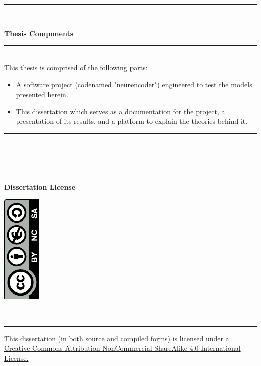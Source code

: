 \documentclass[a4paper, 12pt]{report}
\newenvironment{nscenter}
{\parskip=0.2cm\par\nopagebreak\raggedright}
{\parskip=0pt\par\noindent\ignorespacesafterend}
\begin{document}
\begin{titlepage}	
	\rule{\linewidth}{0.5mm} \\[0.1cm]
	\vspace{-0.1cm}
	\begin{minipage}{\textwidth}
		\Large{\textbf{Thesis Components}}
	\end{minipage}
	\rule{\linewidth}{0.2mm} \\[0.1cm]
	\noindent
		This thesis is comprised of the following parts:
		\begin{itemize}[nosep]
			\item A software project (codenamed "neurencoder") engineered to test the models presented herein.
			\item This dissertation which serves as a documentation for the project, a presentation of its results, and a platform to explain the theories behind it.
		\end{itemize}	
		\vspace{-0.3cm}
	\rule{\linewidth}{0.2mm} \\[0.5cm]
	\noindent
	\rule{\linewidth}{0.5mm} \\[0.1cm]
	\begin{minipage}{0.5\textwidth}
		\Large{\textbf{Dissertation License}}
	\end{minipage}
	\begin{minipage}{0.5\textwidth}
		\begin{flushright}
			\includegraphics[angle=-90]{by-nc-sa}
		\end{flushright}
	\end{minipage}
	\\[0.1cm]
	\rule{\linewidth}{0.2mm}
	\vspace{-0.45cm}
	\begin{nscenter}
		This dissertation (in both source and compiled forms) is licensed under a\\
		\href{http://creativecommons.org/licenses/by-nc-sa/4.0/}{Creative Commons Attribution-NonCommercial-ShareAlike 4.0 International License.}

\end{nscenter}
\end{titlepage}
\end{document}
